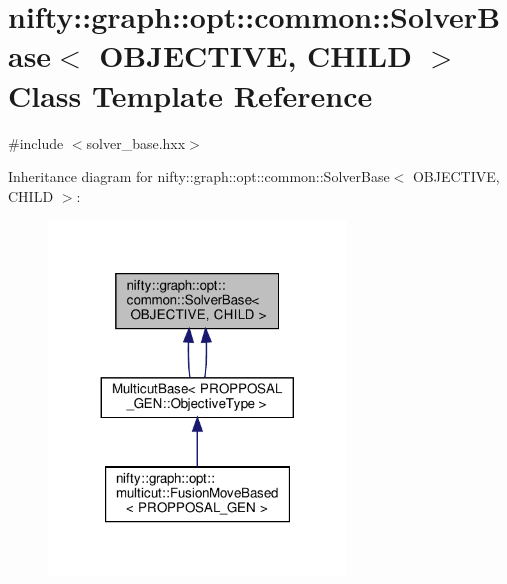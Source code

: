 \hypertarget{classnifty_1_1graph_1_1opt_1_1common_1_1SolverBase}{}\section{nifty\+:\+:graph\+:\+:opt\+:\+:common\+:\+:Solver\+Base$<$ O\+B\+J\+E\+C\+T\+I\+VE, C\+H\+I\+LD $>$ Class Template Reference}
\label{classnifty_1_1graph_1_1opt_1_1common_1_1SolverBase}


{\ttfamily \#include $<$solver\+\_\+base.\+hxx$>$}



Inheritance diagram for nifty\+:\+:graph\+:\+:opt\+:\+:common\+:\+:Solver\+Base$<$ O\+B\+J\+E\+C\+T\+I\+VE, C\+H\+I\+LD $>$\+:
\nopagebreak
\begin{figure}[H]
\begin{center}
\leavevmode
\includegraphics[width=224pt]{classnifty_1_1graph_1_1opt_1_1common_1_1SolverBase__inherit__graph}
\end{center}
\end{figure}
